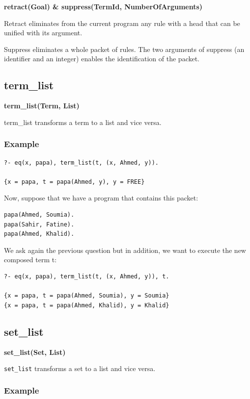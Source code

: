 \documentclass{book}
\begin{document}
{\bf retract(Goal) \& suppress(TermId, NumberOfArguments)}

Retract eliminates from the current program any rule with a head
that can be unified with its argument.

Suppress eliminates a whole packet of rules. The two arguments of
suppress (an identifier and an integer) enables the identification of
the packet.

\subsection{term\_list}

{\bf term\_list(Term, List)}

term\_list transforms a term to a list and vice versa.

\subsubsection{Example}


\begin{verbatim}
?- eq(x, papa), term_list(t, (x, Ahmed, y)).

{x = papa, t = papa(Ahmed, y), y = FREE}
\end{verbatim}



Now, suppose that we have a program that contains this packet:


\begin{verbatim}
papa(Ahmed, Soumia).
papa(Sahir, Fatine).
papa(Ahmed, Khalid).
\end{verbatim}


We ask again the previous question but in
addition, we want to execute the new composed term t:


\begin{verbatim}
?- eq(x, papa), term_list(t, (x, Ahmed, y)), t.

{x = papa, t = papa(Ahmed, Soumia), y = Soumia}
{x = papa, t = papa(Ahmed, Khalid), y = Khalid}
\end{verbatim}


\subsection{set\_list}

{\bf set\_list(Set, List)}

\texttt{set\_list} transforms a set to a list and vice versa.

\subsubsection{Example}
\end{document}
